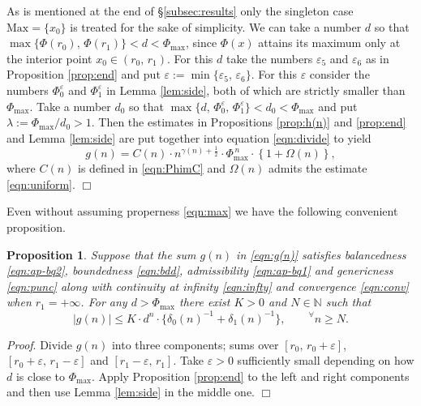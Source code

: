 \documentclass[a4paper,12pt]{article}
\theoremstyle{plain}
\newtheorem{proposition}[theorem]{Proposition}
\def\N{\mathbb{N}}
\def\ve{\varepsilon}
\def\Phim{\Phi_{\scriptstyle \mathrm{max}}}
\def\Mm{\mathrm{M{\scriptstyle ax}}}
\begin{document}
As is mentioned at the end of \S \ref{subsec:results} only the singleton 
case $\Mm = \{ x_0 \}$ is treated for the sake of simplicity. 
We can take a number $d$ so that $\max\{\Phi(r_0), \, \Phi(r_1) \} < d < 
\Phim$, since $\Phi(x)$ attains its maximum only at the interior  
point $x_0 \in (r_0, \, r_1)$.   
For this $d$ take the numbers $\ve_5$ and $\ve_6$ as in  
Proposition \ref{prop:end} and put $\ve := \min \{ \ve_5, \, \ve_6 \}$. 
For this $\ve$ consider the numbers $\Phi_0^{\ve}$ and $\Phi_1^{\ve}$ 
in Lemma \ref{lem:side}, both of which are strictly smaller than $\Phim$. 
Take a number $d_0$ so that $\max\{ d, \, \Phi_0^{\ve}, \, \Phi_1^{\ve} \}  
< d_0 < \Phim$ and put $\lambda := \Phim/d_0 > 1$.  
Then the estimates in Propositions \ref{prop:h(n)} and \ref{prop:end} and 
Lemma \ref{lem:side} are put together into equation \eqref{eqn:divide} to 
yield    
\begin{equation*}
g(n) = C(n) \cdot  n^{\gamma(n) + \frac{1}{2} } \cdot 
\Phim^{\, n} \cdot \left\{ 1 + \Omega(n) \right\},     
\end{equation*} 
where $C(n)$ is defined in \eqref{eqn:PhimC} and $\Omega(n)$ admits 
the estimate \eqref{eqn:uniform}.  \hfill $\Box$ \par \medskip
Even without assuming properness \eqref{eqn:max} we have 
the following convenient proposition. 
\begin{proposition} \label{prop:irregular}
Suppose that the sum $g(n)$ in \eqref{eqn:g(n)} satisfies 
balancedness \eqref{eqn:ap-bq2}, boundedness \eqref{eqn:bdd},  
admissibility \eqref{eqn:ap-bq1} and genericness \eqref{eqn:punc} 
along with continuity at infinity \eqref{eqn:infty} and 
convergence \eqref{eqn:conv} when $r_1 = + \infty$.  
For any $d > \Phim$ there exist $K > 0$ and $N \in \N$ such that 
\[
|g(n)| \le K \cdot d^n \cdot  \{ \delta_0(n)^{-1} + \delta_1(n)^{-1}  \},  
\qquad {}^{\forall} n \ge N.   
\]
\end{proposition}
{\it Proof}. 
Divide $g(n)$ into three components; sums over $[r_0, \, r_0+ \ve]$, 
$[r_0+\ve, \, r_1-\ve]$ and $[r_1-\ve, \, r_1]$. 
Take $\ve > 0$ sufficiently small depending on how $d$ is close to $\Phim$. 
Apply Proposition \ref{prop:end} to the left and right components 
and then use Lemma \ref{lem:side} in the middle one. \hfill $\Box$ 
\end{document}
